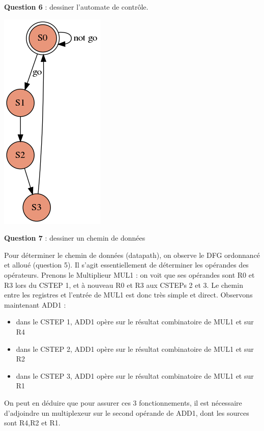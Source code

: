 \documentclass[a4paper,11pt]{exam}
\begin{document}
\begin{questions}
  \question \textbf{Question 6} : dessiner l'automate de contrôle.
  \begin{solution}
    \begin{center}
      \includegraphics[scale=0.4]{fsm.png}
    \end{center}
  \end{solution}
  \question \textbf{Question 7} : dessiner un chemin de données
    \begin{solution}
      Pour déterminer le chemin de données (datapath), on observe le DFG ordonnancé et alloué (question 5). Il s'agit essentiellement de déterminer les opérandes des opérateurs. Prenons le Multiplieur MUL1 : on voit que ses opérandes sont R0 et R3 lors du CSTEP 1, et à nouveau R0 et R3 aux CSTEPs 2 et 3. Le chemin entre les registres et l'entrée de MUL1 est donc très simple et direct. Observons maintenant ADD1 :
      \begin{itemize}
        \item dans le CSTEP 1, ADD1 opère sur le résultat combinatoire de MUL1 et sur R4
        \item dans le CSTEP 2, ADD1 opère sur le résultat combinatoire de MUL1 et sur R2
        \item dans le CSTEP 3, ADD1 opère sur le résultat combinatoire de MUL1 et sur R1
      \end{itemize}
      On peut en déduire que pour assurer ces 3 fonctionnements, il est nécessaire d'adjoindre un multiplexeur sur le second opérande de ADD1, dont les sources sont R4,R2 et R1.

\end{solution}
\end{questions}
\end{document}
